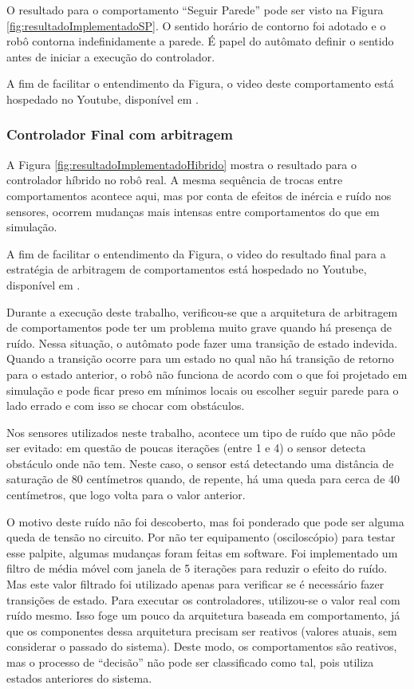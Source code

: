 	O resultado para o comportamento ``Seguir Parede'' pode ser visto na Figura
	\ref{fig:resultadoImplementadoSP}. O sentido horário de contorno foi adotado
	e o robô contorna indefinidamente a parede. É papel do autômato definir o sentido 
	antes de iniciar a execução do controlador.
	
	
	
	A fim de facilitar o entendimento da Figura, o video deste comportamento está 
	hospedado no Youtube, disponível em .
	
	\subsubsection{Controlador Final com arbitragem}

	A Figura \ref{fig:resultadoImplementadoHibrido} mostra o resultado para o controlador híbrido no robô real.
	A mesma sequência de trocas entre comportamentos acontece aqui, mas por conta de efeitos de inércia e ruído
	nos sensores, ocorrem mudanças mais intensas entre comportamentos do que em simulação.
	
	
	
	A fim de facilitar o entendimento da Figura, o video do resultado final para a 
	estratégia de arbitragem de comportamentos está hospedado no Youtube, disponível 
	em .
	
	Durante a execução deste trabalho, verificou-se que a arquitetura de arbitragem de comportamentos pode ter 
	um problema muito grave quando há presença de ruído. Nessa situação, o autômato pode fazer uma transição de 
	estado indevida. Quando a transição ocorre para um estado no qual não há transição de retorno para o estado
	anterior, o robô não funciona de acordo com o que foi projetado em simulação e pode ficar preso em mínimos 
	locais ou escolher seguir parede para o lado errado e com isso se chocar com obstáculos.
	
	Nos sensores utilizados neste trabalho, acontece um tipo de ruído que não pôde ser evitado: em questão de 
	poucas iterações (entre 1 e 4) o sensor detecta obstáculo onde não tem. Neste caso, o sensor está detectando
	uma distância de saturação de 80 centímetros quando, de repente, há uma queda para cerca de 40 centímetros, que
	logo volta para o valor anterior. 
	
	O motivo deste ruído não foi descoberto, mas foi ponderado que pode ser alguma queda de tensão no circuito. 
	Por não ter equipamento (osciloscópio) para testar esse palpite, algumas mudanças foram feitas em software. 
	Foi implementado um filtro de média móvel com janela de 5 iterações para reduzir o efeito do ruído. Mas este
	valor filtrado foi utilizado apenas para verificar se é necessário fazer transições de estado. Para executar
	os controladores, utilizou-se o valor real com ruído mesmo. Isso foge um pouco da arquitetura baseada em 
	comportamento, já que os componentes dessa arquitetura precisam ser reativos (valores atuais, sem considerar 
	o passado do sistema). Deste modo, os comportamentos são reativos, mas o processo de ``decisão'' 
	não pode ser classificado como tal, pois utiliza estados anteriores do sistema.
	
